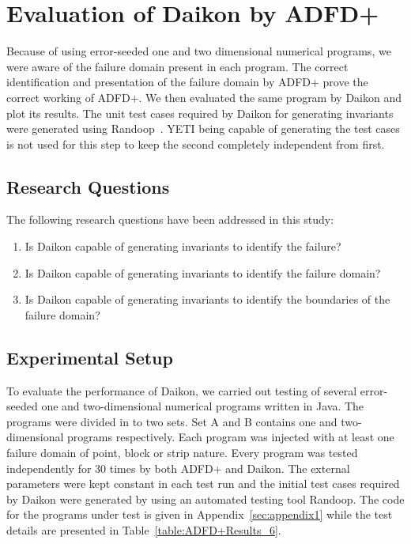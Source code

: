

\section{Evaluation of Daikon by ADFD+}\label{sec:intro6_7}
Because of using error-seeded one and two dimensional numerical programs, we were aware of the failure domain present in each program. The correct identification and presentation of the failure domain by ADFD+ prove the correct working of ADFD+. We then evaluated the same program by Daikon and plot its results. The unit test cases required by Daikon for generating invariants were generated using Randoop~\cite{pacheco2007randoop}. YETI being capable of generating the test cases is not used for this step to keep the second completely independent from first. 

\subsection{Research Questions}\label{sec:intro6_8}
The following research questions have been addressed in this study:
\begin{enumerate}
\item Is Daikon capable of generating invariants to identify the failure?
\item Is Daikon capable of generating invariants to identify the failure domain?
\item Is Daikon capable of generating invariants to identify the boundaries of the failure domain?
\end{enumerate}

\subsection{Experimental Setup}\label{sec:intro6_9}
To evaluate the performance of Daikon, we carried out testing of several error-seeded one and two-dimensional numerical programs written in Java. The programs were divided in to two sets. Set A and B contains one and two-dimensional programs respectively. Each program was injected with at least one failure domain of point, block or strip nature. Every program was tested independently for 30 times by both ADFD+ and Daikon. The external parameters were kept constant in each test run and the initial test cases required by Daikon were generated by using an automated testing tool Randoop. The code for the programs under test is given in Appendix~\ref{sec:appendix1} while the test details are presented in Table~\ref{table:ADFD+Results_6}. 

